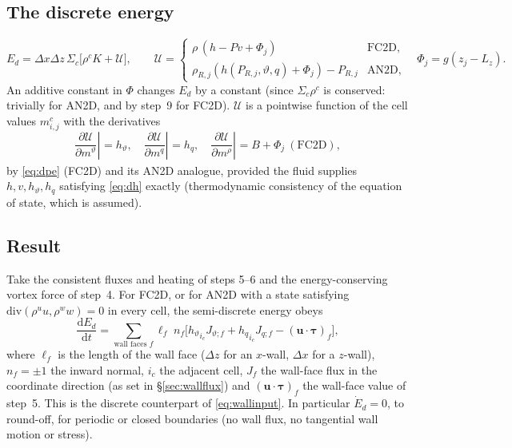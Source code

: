 \documentclass[11pt,a4paper]{article}
\newcommand{\vt}{\vartheta}                    %
\newcommand{\hth}{{h_{\vartheta}}}               %
\newcommand{\hq}{{h_q}}                          %
\newcommand{\bu}{\mathbf{u}}
\newcommand{\btau}{\boldsymbol{\tau}}
\newcommand{\pdc}[3]{\left.\frac{\partial #1}{\partial #2}\right|_{#3}}
\begin{document}
\subsection{The discrete energy}
\begin{equation}
  E_d=\Delta x\Delta z\,\Sigma_c\Big[\rho^cK+\mathcal U\Big],\qquad
  \mathcal U=\begin{cases}\rho\,(h-Pv+\Phi_j)&\text{FC2D},\\ \rho_{R,j}(h(P_{R,j},\vt,q)+\Phi_j)-P_{R,j}&\text{AN2D},\end{cases}\quad\Phi_j=g(z_j-L_z).
\end{equation}
An additive constant in $\Phi$ changes $E_d$ by a constant (since $\Sigma_c\rho^c$ is conserved: trivially for AN2D, and by step~9 for FC2D). $\mathcal U$ is a pointwise function of the cell values $m^c_{i,j}$ with the derivatives
\begin{equation}
  \pdc{\mathcal U}{m^\vt}{}=\hth,\quad\pdc{\mathcal U}{m^q}{}=\hq,\quad\pdc{\mathcal U}{m^\rho}{}=B+\Phi_j\ (\text{FC2D}),
  \label{eq:dU}
\end{equation}
by \eqref{eq:dpe} (FC2D) and its AN2D analogue, provided the fluid supplies $h,v,\hth,\hq$ satisfying \eqref{eq:dh} exactly (thermodynamic consistency of the equation of state, which is assumed).

\subsection{Result}
Take the consistent fluxes and heating of steps 5--6 and the energy-conserving vortex force of step~4. For FC2D, or for AN2D with a state satisfying $\mathrm{div}(\rho^uu,\rho^ww)=0$ in every cell, the semi-discrete energy obeys
\begin{equation}
  \frac{\mathrm{d}E_d}{\mathrm{d}t}=\sum_{\text{wall faces }f}\ell_f\;n_f\Big[\hth_{i_c}J_{\vt;f}+\hq_{i_c}J_{q;f}-(\bu\!\cdot\!\btau)_f\Big],
  \label{eq:thm}
\end{equation}
where $\ell_f$ is the length of the wall face ($\Delta z$ for an $x$-wall, $\Delta x$ for a $z$-wall), $n_f=\pm1$ the inward normal, $i_c$ the adjacent cell, $J_f$ the wall-face flux in the coordinate direction (as set in \S\ref{sec:wallflux}) and $(\bu\!\cdot\!\btau)_f$ the wall-face value of step~5.
This is the discrete counterpart of \eqref{eq:wallinput}. In particular $\dot E_d=0$, to round-off, for periodic or closed boundaries (no wall flux, no tangential wall motion or stress).
\end{document}
